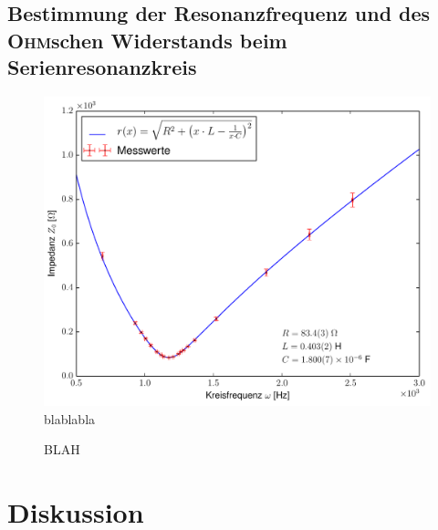 \documentclass[12pt,a4paper,titlepage,headinclude]{scrartcl}
\numberwithin{equation}{section}
\newcommand{\person}[1]{\textsc{#1}}
\begin{document}
\subsection{Bestimmung der Resonanzfrequenz und des \person{Ohm}schen Widerstands beim Serienresonanzkreis}
\begin{figure}[h!]
	\centering
	\includegraphics[width=\textwidth]{plot2.pdf}
	\caption{blablabla}
	\label{fig:plot2}
\end{figure}
\begin{figure}[h!]
	\centering
	
	\caption{BLAH}
	\label{fig:zeiger2}
\end{figure}


\section{Diskussion}
\label{sec:diskussion}

\newpage
\printbibliography[heading=bibintoc]
\end{document}
